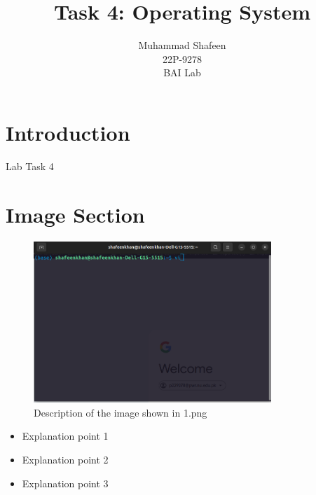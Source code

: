 \documentclass[a4paper,12pt]{article}
\title{Task 4: Operating System}
\author{Muhammad Shafeen \\ 22P-9278 \\ BAI Lab}
\date{}
\begin{document}
\maketitle

\section{Introduction}
Lab Task 4
\section{Image Section}

\begin{figure}[h!]
    \centering
    \includegraphics[width=0.8\textwidth]{1.png}
    \caption{Description of the image shown in 1.png}
    \label{fig:image1}
\end{figure}


\begin{itemize}
    \item Explanation point 1
    \item Explanation point 2
    \item Explanation point 3
\end{itemize}
\end{document}
